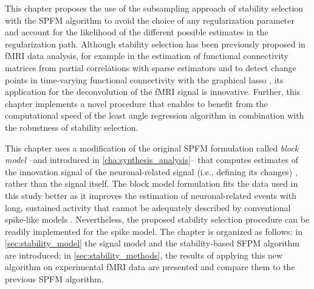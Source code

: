 This chapter proposes the use of the subsampling approach of stability selection
\citep{Meinshausen2010Stabilityselection} with the SPFM algorithm
\citep{Gaudes2013Paradigmfreemapping} to avoid the choice of any regularization
parameter and account for the likelihood of the different possible estimates in
the regularization path. Although stability selection has been previously
proposed in fMRI data analysis, for example in the estimation of functional
connectivity matrices from partial correlations with sparse estimators
\citep{Ryali2012Estimationfunctionalconnectivity} and to detect change points in
time-varying functional connectivity with the graphical lasso
\citep{Cribben2013Detectingfunctionalconnectivity}, its application for the
deconvolution of the fMRI signal is innovative. Further, this chapter implements
a novel procedure that enables to benefit from the computational speed of the
least angle regression algorithm \citep{Efron2004Leastangleregression} in
combination with the robustness of stability selection. 

This chapter uses a modification of the original SPFM formulation called
\textit{block model} --and introduced in \cref{cha:synthesis_analysis}-- that
computes estimates of the innovation signal of the neuronal-related signal
(i.e., defining its changes)
\citep{Karahanoglu2013TotalactivationfMRI,Cherkaoui2019Sparsitybasedblind,Urunuela2023HemodynamicDeconvolutionDemystified},
rather than the signal itself. The block model formulation fits the data used in
this study better as it improves the estimation of neuronal-related events with
long, sustained activity
\citep{Karahanoglu2013TotalactivationfMRI,Cherkaoui2019Sparsitybasedblind,Urunuela2023HemodynamicDeconvolutionDemystified}
that cannot be adequately described by conventional spike-like models
\citep{Khalidov2011ActiveletsWaveletssparse,Gaudes2010Detectioncharacterizationsingle,Gaudes2013Paradigmfreemapping}.
Nevertheless, the proposed stability selection procedure can be readily
implemented for the spike model. The chapter is organized as follows: in
\cref{sec:stability_model} the signal model and the stability-based SFPM
algorithm are introduced; in \cref{sec:stability_methods}, the results of
applying this new algorithm on experimental fMRI data are presented and compare
them to the previous SPFM algorithm.

